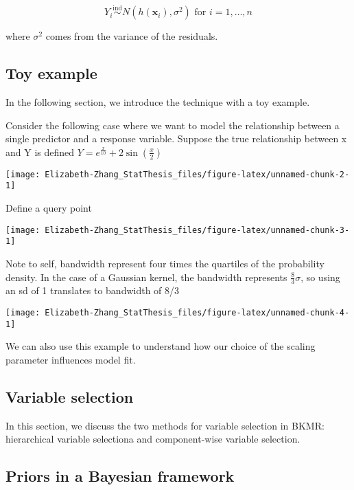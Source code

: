 \documentclass[12pt, twoside]{amherstthesis}
\begin{document}
\[
Y_i \overset{\mathrm{ind}}{\sim} N(h(\textbf{x}_i), \sigma^2) \text{ for } i = 1,\dots,n
\]

\noindent where \(\sigma^2\) comes from the variance of the residuals.

\hypertarget{toy-example}{%
\subsection{Toy example}\label{toy-example}}

In the following section, we introduce the technique with a toy example.

Consider the following case where we want to model the relationship between a single predictor and a response variable. Suppose the true relationship between x and Y is defined \(Y = e^{\frac{x}{10}} + 2\sin(\frac{x}{2})\)
\begin{center}\texttt{[image: Elizabeth-Zhang\_StatThesis\_files/figure-latex/unnamed-chunk-2-1]} \end{center}

Define a query point
\begin{center}\texttt{[image: Elizabeth-Zhang\_StatThesis\_files/figure-latex/unnamed-chunk-3-1]} \end{center}

Note to self, bandwidth represent four times the quartiles of the probability density. In the case of a Gaussian kernel, the bandwidth represents \(\frac{8}{3}\sigma\), so using an sd of 1 translates to bandwidth of 8/3
\begin{center}\texttt{[image: Elizabeth-Zhang\_StatThesis\_files/figure-latex/unnamed-chunk-4-1]} \end{center}

We can also use this example to understand how our choice of the scaling parameter influences model fit.

\hypertarget{variable-selection}{%
\subsection{Variable selection}\label{variable-selection}}

In this section, we discuss the two methods for variable selection in BKMR: hierarchical variable selectiona and component-wise variable selection.

\hypertarget{priors-in-a-bayesian-framework}{%
\subsection{Priors in a Bayesian framework}\label{priors-in-a-bayesian-framework}}
\end{document}

